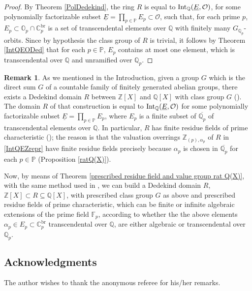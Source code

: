 \documentclass[10pt]{article}
\numberwithin{equation}{section}
\theoremstyle{definition}\newtheorem{Def}[equation]{Definition}
\newtheorem{Rem}[equation]{Remark}
\theoremstyle{definition}\newtheorem{Ques}[equation]{Question}
\newcommand{\F}{\mathbb{F}}
\newcommand{\Q}{\mathbb{Q}}
\newcommand{\Z}{\mathbb{Z}}
\renewcommand{\O}{\mathbb{O}}
\newcommand{\C}{\mathbb{C}}
\newcommand{\PP}{\mathbb{P}}
\newcommand{\Int}{\textnormal{Int}}
\newcommand{\IntQ}{\Int_{\Q}}
\newcommand{\uE}{\underline{E}}
\newcommand{\oQp}{\overline{\Q_p}}
\begin{document}
\begin{proof}
By Theorem \ref{PolDedekind}, the ring $R$ is equal to $\Int_{\Q}(\uE,\mathcal{O})$, for some polynomially factorizable subset $\uE=\prod_{p\in\PP}E_p\subset\mathcal O$, such that, for each prime $p$,  $E_p\subset \O_p\cap\C_p^{\text{br}}$ is a set of transcendental elements over $\Q$ with finitely many $G_{\Q_p}$-orbits. Since by hypothesis  the class group of $R$ is trivial, it follows by Theorem \ref{IntQEODed} that for each $p\in\PP$, $E_p$ contains at most one element, which is transcendental over $\Q$ and unramified over $\Q_p$.
\end{proof}

\begin{Rem}
As we mentioned in the Introduction,  given a group $G$ which is the direct sum $G$ of a countable family of finitely generated abelian groups, there exists a Dedekind domain $R$ between $\Z[X]$ and $\Q[X]$ with class group $G$ (\cite[Theorem 3.1]{PerDedekind}). The domain $R$ of that  construction is equal to
$\IntQ(\uE,\mathcal{O})$ for some polynomially factorizable subset $\uE=\prod_{p\in\PP}E_p$, where $E_p$ is a finite subset of $\oQp$ of transcendental elements over $\Q$. In particular, $R$ has finite residue fields of prime characteristic (\cite[Theorem 2.17]{PerDedekind}); the reason is that the valuation overrings $\Z_{(p),\alpha_p}$ of $R$ in \eqref{IntQEZrepr} have finite residue fields precisely because $\alpha_p$ is chosen in $\oQp$ for each $p\in\PP$ (Proposition \ref{ratQ(X)}).

Now, by means of Theorem \ref{prescribed residue field and value group rat Q(X)}, with the same method used in \cite[Theorem 3.1]{PerDedekind}, we can build a Dedekind domain $R$, $\Z[X]\subset R\subseteq\Q[X]$, with prescribed class group $G$ as above and prescribed residue fields of prime characteristic, which can be finite or infinite algebraic extensions of the prime field $\F_p$, according to whether the the above elements $\alpha_p\in E_p\subset\C_p^{\text{br}}$ transcendental over $\Q$, are either algebraic or transcendental over $\Q_p$.
\end{Rem}

\subsection*{Acknowledgments}

The author wishes to thank the anonymous referee for his/her remarks. 
\end{document}
